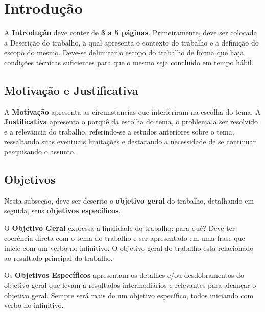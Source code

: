\chapter{Introdução}
\label{sec-intro}



A \textbf{Introdução} deve conter de \textbf{3 a 5 páginas}. Primeiramente, deve ser colocada a
Descrição do trabalho, a qual apresenta o contexto do trabalho e a definição do escopo do
mesmo. Deve-se delimitar o escopo do trabalho de forma que haja condições
técnicas suficientes para que o mesmo seja concluído em tempo hábil.


\section{Motivação e Justificativa}
\label{sec-intro-motjus}

A \textbf{Motivação} apresenta as circunstancias que interferiram na escolha do tema.
A \textbf{Justificativa} apresenta o porquê da escolha do tema, o problema a ser resolvido
e a relevância do trabalho, referindo-se a estudos anteriores sobre o tema, ressaltando
suas eventuais limitações e destacando a necessidade de se continuar pesquisando o
assunto.


\section{Objetivos}
\label{sec-intro-obj}

Nesta subseção, deve ser descrito o \textbf{objetivo geral} do trabalho, detalhando em
seguida, seus \textbf{objetivos específicos}.

O \textbf{Objetivo Geral} expressa a finalidade do trabalho: para quê? Deve ter coerência
direta com o tema do trabalho e ser apresentado em uma frase que inicie com um verbo
no infinitivo. O objetivo geral do trabalho está relacionado ao resultado principal do trabalho.

Os \textbf{Objetivos Específicos} apresentam os detalhes e/ou desdobramentos do
objetivo geral que levam a resultados intermediários e relevantes para alcançar o objetivo geral. Sempre será mais de um objetivo específico, todos iniciando com verbo no infinitivo.


